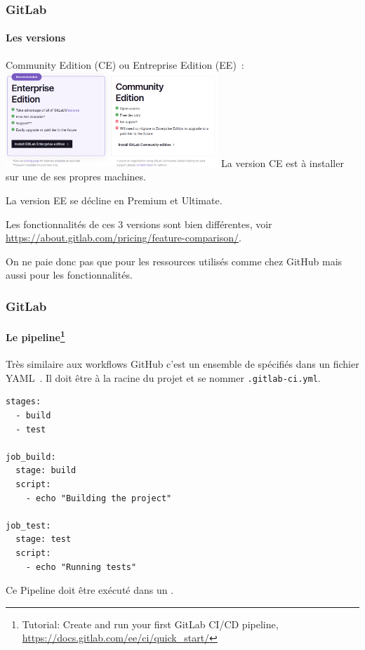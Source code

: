 \documentclass{beamer}
\begin{document}
    \begin{frame}
        \frametitle{GitLab}
        \framesubtitle{Les versions}
        \transdissolve
        Community Edition (CE) ou Entreprise Edition (EE)~:
        \bigbreak
        \centering
        \includegraphics[width=8cm]{image/gitlab-versions}
        \flushleft
        La version CE est à installer sur une de ses propres machines.

        La version EE se décline en Premium et Ultimate.

        Les fonctionnalités de ces 3 versions sont bien différentes, voir \url{https://about.gitlab.com/pricing/feature-comparison/}.

        On ne paie donc pas que pour les ressources utilisés comme chez GitHub mais aussi pour les fonctionnalités.
    \end{frame}

    \begin{frame}[fragile]
        \frametitle{GitLab}
        \framesubtitle{Le pipeline\footnote{Tutorial: Create and run your first GitLab CI/CD pipeline, \url{https://docs.gitlab.com/ee/ci/quick_start/}}}
        \transdissolve
        Très similaire aux workflows GitHub c'est un ensemble de  spécifiés dans un fichier YAML~.
        \bigbreak
        Il doit être à la racine du projet et se nommer \lstinline{.gitlab-ci.yml}.
        \begin{lstlisting}[basicstyle=\ttfamily\tiny]
stages:
  - build
  - test

job_build:
  stage: build
  script:
    - echo "Building the project"

job_test:
  stage: test
  script:
    - echo "Running tests"
        \end{lstlisting}
        Ce Pipeline doit être exécuté dans un .
    \end{frame}
\end{document}
